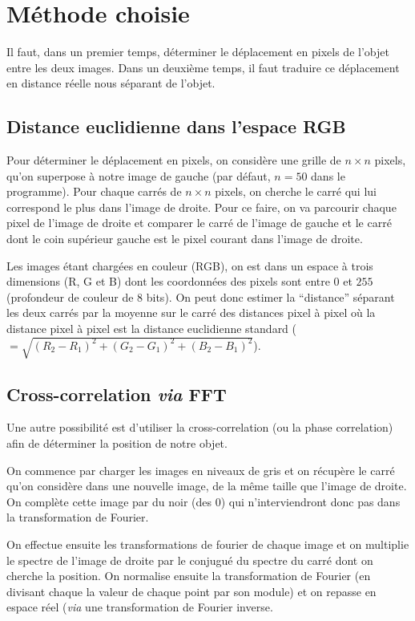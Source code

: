 \documentclass[10pt,a4paper]{article}
\begin{document}
	\section{Méthode choisie}
		Il faut, dans un premier temps, déterminer le déplacement en pixels de l'objet entre les deux images. Dans un deuxième temps, il faut traduire ce déplacement en distance réelle nous séparant de l'objet.
		
		\subsection{Distance euclidienne dans l'espace RGB}
			Pour déterminer le déplacement en pixels, on considère une grille de $n\times n$ pixels, qu'on superpose à notre image de gauche (par défaut, $n = 50$ dans le programme). Pour chaque carrés de $n\times n$ pixels, on cherche le carré qui lui correspond le plus dans l'image de droite. Pour ce faire, on va parcourir chaque pixel de l'image de droite et comparer le carré de l'image de gauche et le carré dont le coin supérieur gauche est le pixel courant dans l'image de droite. 
		
			Les images étant chargées en couleur (RGB), on est dans un espace à trois dimensions (R, G et B) dont les coordonnées des pixels sont entre $0$ et $255$ (profondeur de couleur de 8 bits). On peut donc estimer la ``distance'' séparant les deux carrés par la moyenne sur le carré des distances pixel à pixel où la distance pixel à pixel est la distance euclidienne standard ($=\sqrt{(R_2 - R_1)^2 + (G_2 - G_1)^2 + (B_2 - B_1)^2}$).
		
		\subsection{Cross-correlation \emph{via} FFT}
			Une autre possibilité est d'utiliser la cross-correlation (ou la phase correlation) afin de déterminer la position de notre objet.
			
			On commence par charger les images en niveaux de gris et on récupère le carré qu'on considère dans une nouvelle image, de la même taille que l'image de droite. On complète cette image par du noir (des 0) qui n'interviendront donc pas dans la transformation de Fourier.
			
			On effectue ensuite les transformations de fourier de chaque image et on multiplie le spectre de l'image de droite par le conjugué du spectre du carré dont on cherche la position. On normalise ensuite la transformation de Fourier (en divisant chaque la valeur de chaque point par son module) et on repasse en espace réel (\emph{via} une transformation de Fourier inverse.
			
\end{document}
